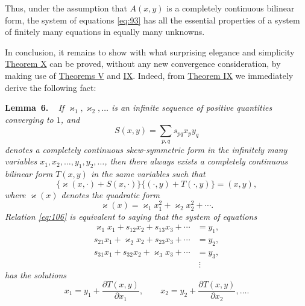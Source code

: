 \documentclass[b5paper,twoside]{article}
\makeatletter
\newcommand{\hilbertstatementname}[2]{%
  \textbf{#1\if\relax\detokenize{#2}\relax\else\ #2\fi.}%
}
\newenvironment{lemma}[1][]{%
  \par\addvspace{.7\baselineskip}%
  \phantomsection
  \protected@edef\@currentlabel{#1}%
  \noindent\hilbertstatementname{Lemma}{#1}\ \itshape\ignorespaces
}{%
  \par\addvspace{.7\baselineskip}%
}
\newcommand{\originalpage}[1]{\phantomsection\label{origpage:#1}}
\makeatother
\begin{document}
Thus, under the assumption that $A(x,y)$ is a completely continuous bilinear
form, the system of equations \eqref{eq:93} has all the essential properties
of a system of finitely many equations in equally many unknowns.

In conclusion, it remains to show with what surprising elegance and
simplicity \hyperref[thm:X]{Theorem X} can be proved, without any new
convergence consideration, by making use of \hyperref[thm:V]{Theorems V}
and \hyperref[thm:IX]{IX}. Indeed, from \hyperref[thm:IX]{Theorem IX} we
immediately derive the following fact:

\begin{lemma}[6]\label{lem:6}
If $\varkappa_1,\varkappa_2,\ldots$ is an infinite sequence of positive
quantities converging to $1$, and
\[
  S(x,y)=\sum_{p,q}s_{pq}x_py_q
\]
denotes a completely continuous skew-symmetric form in the infinitely many
variables $x_1,x_2,\ldots,y_1,y_2,\ldots$, then there always exists a
completely continuous bilinear form $T(x,y)$ in the same variables such that
\begin{equation}
  \bigl\{\varkappa(x,\mathord{\cdot})+S(x,\mathord{\cdot})\bigr\}
  \bigl\{(\mathord{\cdot},y)+T(\mathord{\cdot},y)\bigr\}
  =(x,y),
  \tag{106}\label{eq:106}
\end{equation}
where $\varkappa(x)$ denotes the quadratic form
\[
  \varkappa(x)=\varkappa_1x_1^2+\varkappa_2x_2^2+\cdots.
\]
Relation \eqref{eq:106} is equivalent to saying that the system of equations
\begin{equation}
  \begin{aligned}
    \varkappa_1x_1+s_{12}x_2+s_{13}x_3+\cdots&=y_1,\\
    s_{21}x_1+\varkappa_2x_2+s_{23}x_3+\cdots&=y_2,\\
    s_{31}x_1+s_{32}x_2+\varkappa_3x_3+\cdots&=y_3,\\
    &\ \vdots
  \end{aligned}
  \tag{107}\label{eq:107}
\end{equation}
has the solutions
\originalpage{224}
\[
  x_1=y_1+\frac{\partial T(x,y)}{\partial x_1},
  \qquad
  x_2=y_2+\frac{\partial T(x,y)}{\partial x_2},\ldots.
\]
\end{lemma}
\end{document}
